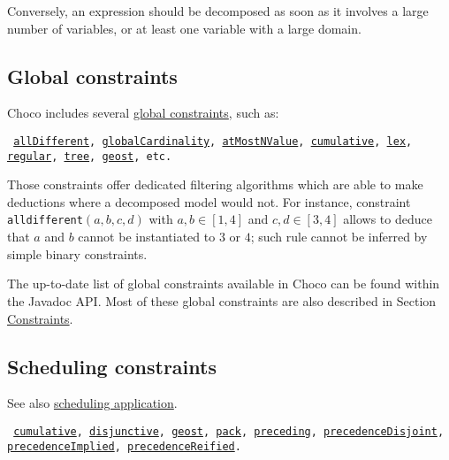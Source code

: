 Conversely, an expression should be decomposed as soon as it involves a large number of variables, or at least one variable with a large domain.


\subsection{Global constraints}\label{model:advancedconstraints}\hypertarget{model:advancedconstraints}{}
Choco includes several \href{http://www.emn.fr/x-info/sdemasse/gccat/}{global constraints}, such as:
\begin{notedef}\tt
\hyperlink{alldifferent:alldifferentconstraint}{allDifferent}, 
\hyperlink{globalcardinality:globalcardinalityconstraint}{globalCardinality}, 
\hyperlink{atmostnvalue:atmostnvalueconstraint}{atMostNValue},
\hyperlink{cumulative:cumulativeconstraint}{cumulative}, 
\hyperlink{lex:lexconstraint}{lex}, 
\hyperlink{regular:regularconstraint}{regular},
 \hyperlink{tree:treeconstraint}{tree},
\hyperlink{geost:geostconstraint}{geost}, etc.
\end{notedef}
Those constraints offer dedicated filtering algorithms which are able to make deductions where a decomposed model would not.
For instance, constraint \texttt{alldifferent}$(a,b,c,d)$ with $a,b\in[1,4]$ and $c,d\in[3,4]$ allows to deduce that $a$ and $b$ cannot be instantiated to $3$ or $4$; such rule cannot be inferred by simple binary constraints. 

The up-to-date list of global constraints available in Choco can be found within the Javadoc API.
Most of these global constraints are also described in Section \hyperlink{ch:constraints}{Constraints}.

\subsection{Scheduling constraints}\label{model:schedulingconstraints}\hypertarget{model:schedulingconstraints}{}
See also \hyperlink{schedulinganduseofthecumulative:schedulinganduseofthecumulativeconstraint}{scheduling application}.
\begin{notedef}\tt
\hyperlink{cumulative:cumulativeconstraint}{cumulative}, 
\hyperlink{disjunctive:disjunctiveconstraint}{disjunctive}, 
\hyperlink{geost:geostconstraint}{geost}, 
\hyperlink{pack:packconstraint}{pack}, 
\hyperlink{preceding:precedingconstraint}{preceding}, 
\hyperlink{precedencedisjoint:precedencedisjointconstraint}{precedenceDisjoint}, 
\hyperlink{precedenceimplied:precedenceimpliedconstraint}{precedenceImplied}, 
\hyperlink{precedencereified:precedencereifiedconstraint}{precedenceReified}.
\end{notedef}

